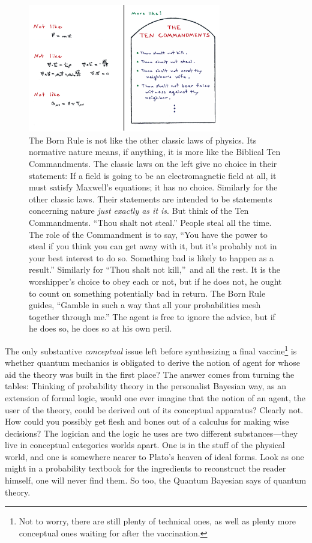 \begin{figure}
\begin{center}
\includegraphics[height=2.2in]{normativelawsupdate2.eps}
\caption{\small The Born Rule is not like the other classic laws of physics.  Its normative nature means, if anything, it is more like the Biblical Ten Commandments.  The classic laws on the left give no choice in their statement: If a field is going to be an electromagnetic field at all, it must satisfy Maxwell's equations; it has no choice.  Similarly for the other classic laws.  Their statements are intended to be statements concerning nature {\it just exactly as it is}.  But think of the Ten Commandments.  ``Thou shalt not steal.''  People steal all the time.  The role of the Commandment is to say, ``You have the power to steal if you think you can get away with it, but it's probably not in your best interest to do so.  Something bad is likely to happen as a result.''  Similarly for ``Thou shalt not kill,''\ and all the rest.  It is the worshipper's choice to obey each or not, but if he does not, he ought to count on something potentially bad in return.  The Born Rule guides, ``Gamble in such a way that all your probabilities mesh together through me.''  The agent is free to ignore the advice, but if he does so, he does so at his own peril.}
\end{center}
\end{figure}

The only substantive {\it conceptual\/} issue left before synthesizing a final vaccine\footnote{Not to worry, there are still plenty of technical ones,  as well as plenty more conceptual ones waiting for after the vaccination.} is whether quantum mechanics is obligated to derive the notion of agent for whose aid the theory was built in the first place?  The answer comes from turning the tables:  Thinking of probability theory in the personalist Bayesian way, as an extension of formal logic, would one ever imagine that the notion of an agent, the user of the theory, could be derived out of its conceptual apparatus?  Clearly not.  How could you possibly get flesh and bones out of a calculus for making wise decisions?  The logician and the logic he uses are two different substances---they live in conceptual categories worlds apart.  One is in the stuff of the physical world, and one is somewhere nearer to Plato's heaven of ideal forms.  Look as one might in a probability textbook for the ingredients to reconstruct the reader himself, one will never find them.  So too, the Quantum Bayesian says of quantum theory.

